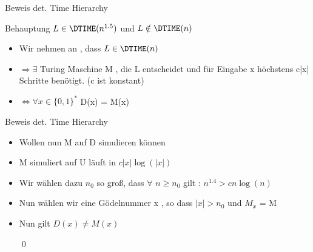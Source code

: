 \begin{frame}{Beweis det. Time Hierarchy}
	\begin{KITblock}{Behauptung}
		$L \in \DTIME(n^{1.5})$ und $L \notin \DTIME(n)$
	\end{KITblock}
	\pause
	\begin{itemize}[<+->]
		\item Wir nehmen an , dass $L \in \DTIME(n)$
		\item $\Rightarrow \exists$ Turing Maschine M , die L entscheidet und für Eingabe x  				höchstens c|x| Schritte benötigt. (c ist konstant)
		\item $\Leftrightarrow \forall x \in {\lbrace 0,1 \rbrace }^{*}$ D(x) = M(x)
	\end{itemize}
\end{frame}

\begin{frame}{Beweis det. Time Hierarchy}
	\begin{itemize}[<+->]
		\item Wollen nun M auf D simulieren können
		\item M simuliert auf U läuft in $c|x|\log(|x|)$
		\item Wir wählen dazu $n_0$ so groß, dass $\forall$ $n \geq n_0$ gilt :
			$n^{1.4} > cn\log(n)$		
		\item Nun wählen wir eine Gödelnummer x , so dass $|x| > n_0$ und $M_x$ = M
		\item Nun gilt $D(x) \neq M(x)$ 
		
		\qed 
	\end{itemize}
\end{frame}
